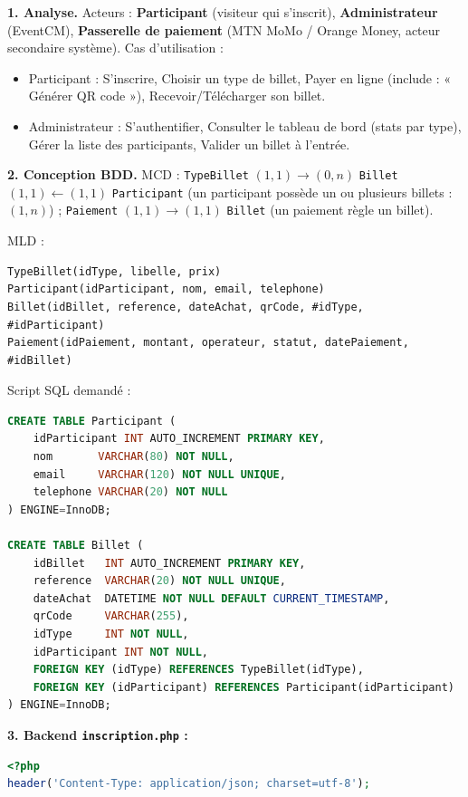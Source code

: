\documentclass[11pt]{article}
\begin{document}
\begin{corrige}
\textbf{1. Analyse.} Acteurs : \textbf{Participant} (visiteur qui s'inscrit), \textbf{Administrateur} (EventCM), \textbf{Passerelle de paiement} (MTN MoMo / Orange Money, acteur secondaire système). Cas d'utilisation :
\begin{itemize}
    \item Participant : S'inscrire, Choisir un type de billet, Payer en ligne (include : « Générer QR code »), Recevoir/Télécharger son billet.
    \item Administrateur : S'authentifier, Consulter le tableau de bord (stats par type), Gérer la liste des participants, Valider un billet à l'entrée.
\end{itemize}

\textbf{2. Conception BDD.}
MCD : \texttt{TypeBillet} $(1,1) \to (0,n)$ \texttt{Billet} $(1,1) \leftarrow (1,1)$ \texttt{Participant} (un participant possède un ou plusieurs billets : $(1,n)$) ; \texttt{Paiement} $(1,1) \to (1,1)$ \texttt{Billet} (un paiement règle un billet).

MLD :
\begin{lstlisting}
TypeBillet(idType, libelle, prix)
Participant(idParticipant, nom, email, telephone)
Billet(idBillet, reference, dateAchat, qrCode, #idType, #idParticipant)
Paiement(idPaiement, montant, operateur, statut, datePaiement, #idBillet)
\end{lstlisting}

Script SQL demandé :
\begin{lstlisting}[language=SQL]
CREATE TABLE Participant (
    idParticipant INT AUTO_INCREMENT PRIMARY KEY,
    nom       VARCHAR(80) NOT NULL,
    email     VARCHAR(120) NOT NULL UNIQUE,
    telephone VARCHAR(20) NOT NULL
) ENGINE=InnoDB;

CREATE TABLE Billet (
    idBillet   INT AUTO_INCREMENT PRIMARY KEY,
    reference  VARCHAR(20) NOT NULL UNIQUE,
    dateAchat  DATETIME NOT NULL DEFAULT CURRENT_TIMESTAMP,
    qrCode     VARCHAR(255),
    idType     INT NOT NULL,
    idParticipant INT NOT NULL,
    FOREIGN KEY (idType) REFERENCES TypeBillet(idType),
    FOREIGN KEY (idParticipant) REFERENCES Participant(idParticipant)
) ENGINE=InnoDB;
\end{lstlisting}

\textbf{3. Backend \texttt{inscription.php} :}
\begin{lstlisting}[language=Php]
<?php
header('Content-Type: application/json; charset=utf-8');


\end{lstlisting}
\end{corrige}
\end{document}
